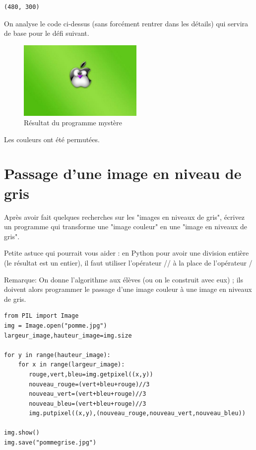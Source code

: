 \documentclass[11pt]{article}
\begin{document}
\begin{verbatim}
(480, 300)
\end{verbatim}


On analyse le code ci-dessus (sans forcément rentrer dans les détails) qui servira de base pour le défi suivant.

\begin{figure}[htbp]
\centering
\includegraphics[width=6cm]{pommeMystere.jpg}
\caption{Résultat du programme mystère}
\end{figure}

Les couleurs ont été permutées.


\section{Passage d'une image en niveau de gris}
\label{sec:org9412e29}

Après avoir fait quelques recherches sur les "images en niveaux de gris", écrivez un programme qui transforme une "image couleur" en une "image en niveaux de gris".

Petite astuce qui pourrait vous aider : en Python pour avoir une division entière (le résultat est un entier), il faut utiliser l'opérateur // à la place de l'opérateur / 

Remarque: On donne l'algorithme aux élèves (ou on le construit avec eux) ; ils doivent alors programmer le passage d'une image couleur à une image en niveaux de gris.


\begin{verbatim}
from PIL import Image
img = Image.open("pomme.jpg")
largeur_image,hauteur_image=img.size

for y in range(hauteur_image):
    for x in range(largeur_image):
       rouge,vert,bleu=img.getpixel((x,y))
       nouveau_rouge=(vert+bleu+rouge)//3
       nouveau_vert=(vert+bleu+rouge)//3
       nouveau_bleu=(vert+bleu+rouge)//3
       img.putpixel((x,y),(nouveau_rouge,nouveau_vert,nouveau_bleu))

img.show()
img.save("pommegrise.jpg")
\end{verbatim}
\end{document}
